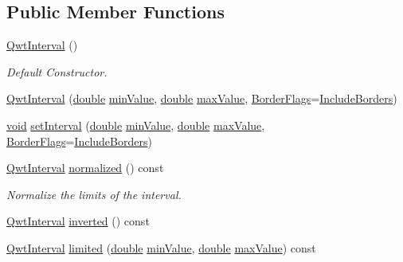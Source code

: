 \subsection*{Public Member Functions}
\begin{DoxyCompactItemize}
\item 
\hyperlink{class_qwt_interval_acd8699b69f46bcea31fa225d1425add3}{Qwt\-Interval} ()
\begin{DoxyCompactList}\small\item\em Default Constructor. \end{DoxyCompactList}\item 
\hyperlink{class_qwt_interval_a6c48e99ff0a44784a4084dd8b1bc3fec}{Qwt\-Interval} (\hyperlink{_super_l_u_support_8h_a8956b2b9f49bf918deed98379d159ca7}{double} \hyperlink{class_qwt_interval_a173c9193bd16f99589db60326df04310}{min\-Value}, \hyperlink{_super_l_u_support_8h_a8956b2b9f49bf918deed98379d159ca7}{double} \hyperlink{class_qwt_interval_aac7cffc81147c07efc4a95c2e6222a1a}{max\-Value}, \hyperlink{class_qwt_interval_a678a26fcaa91cca596d9aebcbf5776c9}{Border\-Flags}=\hyperlink{class_qwt_interval_a3a4b4e49495108c660fc07a62af7ac54ad8a550b5eb1062cd84bcba22c60e5e60}{Include\-Borders})
\item 
\hyperlink{group___u_a_v_objects_plugin_ga444cf2ff3f0ecbe028adce838d373f5c}{void} \hyperlink{class_qwt_interval_a0373ca3cdb22ed507e4188fd06f68b17}{set\-Interval} (\hyperlink{_super_l_u_support_8h_a8956b2b9f49bf918deed98379d159ca7}{double} \hyperlink{class_qwt_interval_a173c9193bd16f99589db60326df04310}{min\-Value}, \hyperlink{_super_l_u_support_8h_a8956b2b9f49bf918deed98379d159ca7}{double} \hyperlink{class_qwt_interval_aac7cffc81147c07efc4a95c2e6222a1a}{max\-Value}, \hyperlink{class_qwt_interval_a678a26fcaa91cca596d9aebcbf5776c9}{Border\-Flags}=\hyperlink{class_qwt_interval_a3a4b4e49495108c660fc07a62af7ac54ad8a550b5eb1062cd84bcba22c60e5e60}{Include\-Borders})
\item 
\hyperlink{class_qwt_interval}{Qwt\-Interval} \hyperlink{class_qwt_interval_a662aa6c6f7d575c72023eb32c0974508}{normalized} () const 
\begin{DoxyCompactList}\small\item\em Normalize the limits of the interval. \end{DoxyCompactList}\item 
\hyperlink{class_qwt_interval}{Qwt\-Interval} \hyperlink{class_qwt_interval_ac55c2cc97b9f7973cb3fab4536f48486}{inverted} () const 
\item 
\hyperlink{class_qwt_interval}{Qwt\-Interval} \hyperlink{class_qwt_interval_a7ba77698fdc61495ff4fbbaf3095184b}{limited} (\hyperlink{_super_l_u_support_8h_a8956b2b9f49bf918deed98379d159ca7}{double} \hyperlink{class_qwt_interval_a173c9193bd16f99589db60326df04310}{min\-Value}, \hyperlink{_super_l_u_support_8h_a8956b2b9f49bf918deed98379d159ca7}{double} \hyperlink{class_qwt_interval_aac7cffc81147c07efc4a95c2e6222a1a}{max\-Value}) const 

\end{DoxyCompactItemize}
